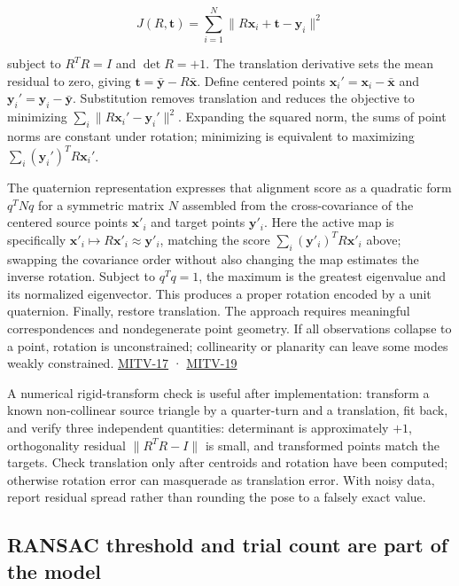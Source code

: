 \[
J(R,\mathbf t)=\sum_{i=1}^N\|R\mathbf x_i+\mathbf t-\mathbf y_i\|^2
\]

subject to \(R^TR=I\) and \(\det R=+1\). The translation derivative sets the mean residual to zero, giving \(\mathbf t=\bar{\mathbf y}-R\bar{\mathbf x}\). Define centered points \(\mathbf x_i'=\mathbf x_i-\bar{\mathbf x}\) and \(\mathbf y_i'=\mathbf y_i-\bar{\mathbf y}\). Substitution removes translation and reduces the objective to minimizing \(\sum_i\|R\mathbf x_i'-\mathbf y_i'\|^2\). Expanding the squared norm, the sums of point norms are constant under rotation; minimizing is equivalent to maximizing \(\sum_i(\mathbf y_i')^TR\mathbf x_i'\).

The quaternion representation expresses that alignment score as a quadratic form \(q^TNq\) for a symmetric matrix \(N\) assembled from the cross-covariance of the centered source points \(\mathbf x'_i\) and target points \(\mathbf y'_i\). Here the active map is specifically \(\mathbf x'_i\mapsto R\mathbf x'_i\approx\mathbf y'_i\), matching the score \(\sum_i(\mathbf y'_i)^TR\mathbf x'_i\) above; swapping the covariance order without also changing the map estimates the inverse rotation. Subject to \(q^Tq=1\), the maximum is the greatest eigenvalue and its normalized eigenvector. This produces a proper rotation encoded by a unit quaternion. Finally, restore translation. The approach requires meaningful correspondences and nondegenerate point geometry. If all observations collapse to a point, rotation is unconstrained; collinearity or planarity can leave some modes weakly constrained. \hyperref[04-visual-computing-ii-ch036-mitv-17---photogrammetry-orientation-axes-of-inertia-symmetry-orientation]{MITV-17} · \hyperref[04-visual-computing-ii-ch036-mitv-19---absolute-orientation-in-closed-form-outliers-and-robustness-ransac]{MITV-19}

A numerical rigid-transform check is useful after implementation: transform a known non-collinear source triangle by a quarter-turn and a translation, fit back, and verify three independent quantities: determinant is approximately \(+1\), orthogonality residual \(\|R^TR-I\|\) is small, and transformed points match the targets. Check translation only after centroids and rotation have been computed; otherwise rotation error can masquerade as translation error. With noisy data, report residual spread rather than rounding the pose to a falsely exact value.

\subsection{RANSAC threshold and trial count are part of the model}\label{04-visual-computing-ii-ch032-ransac-threshold-and-trial-count-are-part-of-the-model}

